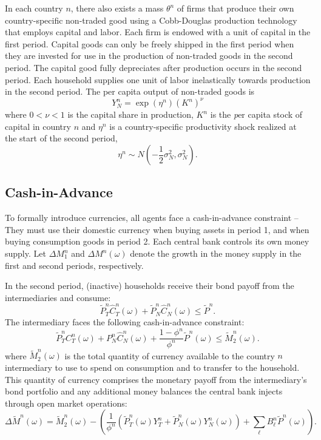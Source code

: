 \documentclass[12pt]{article}
\begin{document}
In each country $n$, there also exists a mass $\theta^n$ of firms that
produce their own country-specific non-traded good using a
Cobb-Douglas production technology that employs capital and labor.
Each firm is endowed with a unit of capital in the first period.
Capital goods can only be freely shipped in the first period when they
are invested for use in the production of non-traded goods in the
second period. The capital good fully depreciates after production
occurs in the second period. Each household supplies one unit of labor
inelastically towards production in the second period. The per capita
output of non-traded goods is
\begin{equation*}
  Y_N^n  = \exp \left( \eta^n \right) \left( K^n \right)^{\nu}
\end{equation*}
where $0 < \nu < 1$ is the capital share in production, $K^n$ is the
{\emph per capita} stock of capital in country $n$ and $\eta^n$ is a
country-specific productivity shock realized at the start of the
second period,
\begin{equation*}
  \eta^n \sim N\left( - \frac{1}{2} \sigma_N^2, \sigma_N^2 \right).
\end{equation*}

\subsection*{Cash-in-Advance}

To formally introduce currencies, all agents face a cash-in-advance
constraint -- They must use their domestic currency when buying assets
in period 1, and when buying consumption goods in period 2. Each
central bank controls its own money supply. Let $\Delta M^n_1$ and
$\Delta M^n(\omega)$ denote the growth in the money supply in the
first and second periods, respectively.

In the second period, (inactive) households receive their bond payoff
from the intermediaries and consume:
\begin{equation*}
  \tilde{P}^n_T \hat{C}^n_T(\omega) + \tilde{P}^n_N \hat{C}^n_N(\omega)
  \le \tilde{P}^n.
\end{equation*}
The intermediary faces the following cash-in-advance constraint:
\begin{equation*}
  \tilde{P}^n_T C^n_T(\omega) + P^n_N \hat{C}^n_N(\omega)
  + \frac{1 - \phi^n}{\phi^n} \tilde{P}^n(\omega)
  \le \tilde{M}^n_2(\omega).
\end{equation*}
where $\tilde{M}^n_2(\omega)$ is the total quantity of currency
available to the country $n$ intermediary to use to spend on
consumption and to transfer to the household. This quantity of
currency comprises the monetary payoff from the intermediary's bond
portfolio and any additional money balances the central bank injects
through open market operations:
\begin{equation*}
  \Delta \tilde{M}^n(\omega)
  = \tilde{M}^n_2(\omega)
  - \left(
    \frac{1}{\phi^n} \left(
      \tilde{P}^n_T(\omega) Y^n_T + \tilde{P}^n_N(\omega) Y^n_N(\omega)
    \right) + \sum_\ell B^n_\ell \tilde{P}^n(\omega) 
  \right).
\end{equation*}
\end{document}
